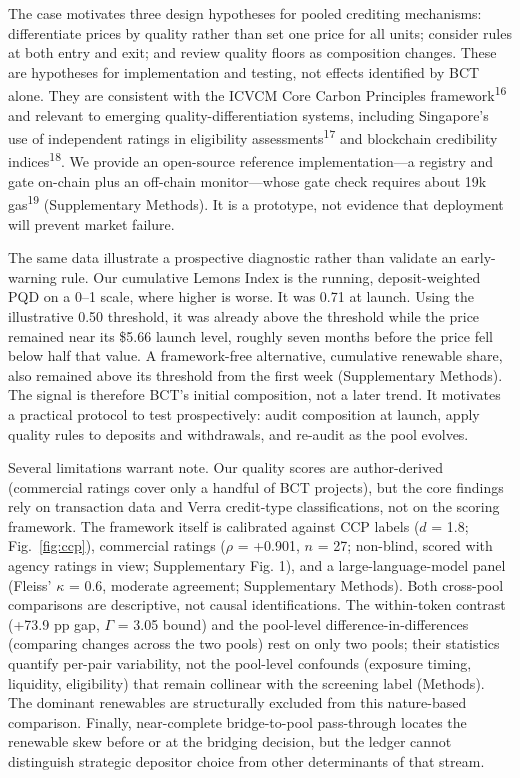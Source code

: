 \documentclass[sn-nature,Numbered]{sn-jnl}
\begin{document}
The case motivates three design hypotheses for pooled crediting mechanisms: differentiate prices by quality rather than set one price for all units; consider rules at both entry and exit; and review quality floors as composition changes. These are hypotheses for implementation and testing, not effects identified by BCT alone. They are consistent with the ICVCM Core Carbon Principles framework\textsuperscript{16} and relevant to emerging quality-differentiation systems, including Singapore's use of independent ratings in eligibility assessments\textsuperscript{17} and blockchain credibility indices\textsuperscript{18}. We provide an open-source reference implementation---a registry and gate on-chain plus an off-chain monitor---whose gate check requires about 19k gas\textsuperscript{19} (Supplementary Methods). It is a prototype, not evidence that deployment will prevent market failure.

The same data illustrate a prospective diagnostic rather than validate an early-warning rule. Our cumulative Lemons Index is the running, deposit-weighted PQD on a 0--1 scale, where higher is worse. It was 0.71 at launch. Using the illustrative 0.50 threshold, it was already above the threshold while the price remained near its \$5.66 launch level, roughly seven months before the price fell below half that value. A framework-free alternative, cumulative renewable share, also remained above its threshold from the first week (Supplementary Methods). The signal is therefore BCT's initial composition, not a later trend. It motivates a practical protocol to test prospectively: audit composition at launch, apply quality rules to deposits and withdrawals, and re-audit as the pool evolves.

Several limitations warrant note. Our quality scores are author-derived (commercial ratings cover only a handful of BCT projects), but the core findings rely on transaction data and Verra credit-type classifications, not on the scoring framework. The framework itself is calibrated against CCP labels ($d$ = 1.8; Fig.~\ref{fig:ccp}), commercial ratings ($\rho$ = +0.901, $n$ = 27; non-blind, scored with agency ratings in view; Supplementary Fig. 1), and a large-language-model panel (Fleiss' $\kappa$ = 0.6, moderate agreement; Supplementary Methods). Both cross-pool comparisons are descriptive, not causal identifications. The within-token contrast (+73.9 pp gap, $\Gamma$ = 3.05 bound) and the pool-level difference-in-differences (comparing changes across the two pools) rest on only two pools; their statistics quantify per-pair variability, not the pool-level confounds (exposure timing, liquidity, eligibility) that remain collinear with the screening label (Methods). The dominant renewables are structurally excluded from this nature-based comparison. Finally, near-complete bridge-to-pool pass-through locates the renewable skew before or at the bridging decision, but the ledger cannot distinguish strategic depositor choice from other determinants of that stream.
\end{document}
